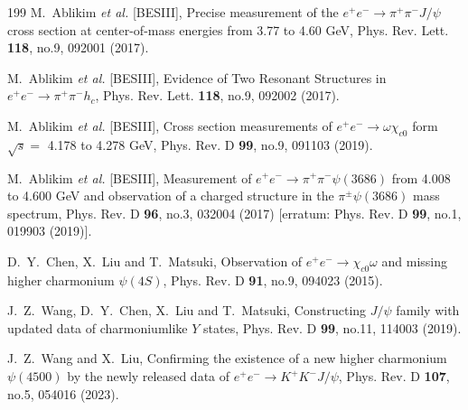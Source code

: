 \documentclass[prl,twocolumn,floatfix,amsmath,nofootinbib,amssymb,floatfix]{revtex4}
\begin{document}
\begin{thebibliography}{199}
M.~Ablikim \textit{et al.} [BESIII],
Precise measurement of the $e^+e^-\to \pi^+\pi^-J/\psi$ cross section at center-of-mass energies from 3.77 to 4.60 GeV,
Phys. Rev. Lett. \textbf{118}, no.9, 092001 (2017).


M.~Ablikim \textit{et al.} [BESIII],
Evidence of Two Resonant Structures in $e^+ e^- \to \pi^+ \pi^- h_c$,
Phys. Rev. Lett. \textbf{118}, no.9, 092002 (2017).


M.~Ablikim \textit{et al.} [BESIII],
Cross section measurements of $e^+ e^-\to\omega\chi_{c0}$ form $\sqrt{s}=$ 4.178 to 4.278 GeV,
Phys. Rev. D \textbf{99}, no.9, 091103 (2019).


M.~Ablikim \textit{et al.} [BESIII],
Measurement of $e^{+}e^{-}\rightarrow \pi^{+}\pi^{-}\psi(3686)$ from 4.008 to 4.600 GeV and observation of a charged structure in the $\pi^{\pm}\psi(3686)$ mass spectrum,
Phys. Rev. D \textbf{96}, no.3, 032004 (2017)
[erratum: Phys. Rev. D \textbf{99}, no.1, 019903 (2019)].


D.~Y.~Chen, X.~Liu and T.~Matsuki,
Observation of $e^+e^-\to \chi_{c0}\omega$ and missing higher charmonium $\psi(4S)$,
Phys. Rev. D \textbf{91}, no.9, 094023 (2015).

J.~Z.~Wang, D.~Y.~Chen, X.~Liu and T.~Matsuki,
Constructing $J/\psi$ family with updated data of charmoniumlike $Y$ states,
Phys. Rev. D \textbf{99}, no.11, 114003 (2019).

J.~Z.~Wang and X.~Liu,
Confirming the existence of a new higher charmonium $\psi(4500)$  by the newly released data of $e^+e^- \to K^+K^-J/\psi$,
Phys. Rev. D \textbf{107}, no.5, 054016 (2023).



\end{thebibliography}
\end{document}

